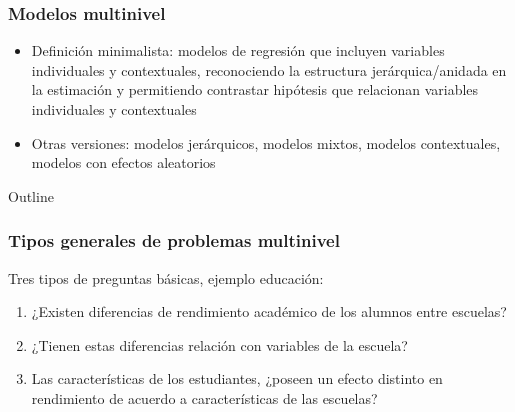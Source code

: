 \documentclass[]{beamer} %
\begin{document}
	\begin{frame}%
		\begin{minipage}{\textwidth} %
		\end{minipage}
	\end{frame}


	\begin{frame}%
	\frametitle{Modelos multinivel}

			\begin{itemize}%
				\item Definición minimalista: modelos de regresión que incluyen variables individuales y contextuales, reconociendo la estructura jerárquica/anidada en la estimación y permitiendo contrastar hipótesis que relacionan variables individuales y contextuales
				\item Otras versiones: modelos jerárquicos, modelos mixtos, modelos contextuales, modelos con efectos aleatorios
			\end{itemize}
	\end{frame}

	\begin{frame}[allowframebreaks]{Outline}
	\frametitle{Tipos generales de problemas multinivel}

	Tres tipos de preguntas básicas, ejemplo educación:
	\begin{enumerate}%
		\item ¿Existen diferencias de rendimiento académico de los alumnos entre escuelas?
		\item ¿Tienen estas diferencias relación con variables de la escuela?
		\item Las características de los estudiantes, ¿poseen un efecto distinto en rendimiento de acuerdo a características de las escuelas?
	\end{enumerate}

\end{frame}
\end{document}
